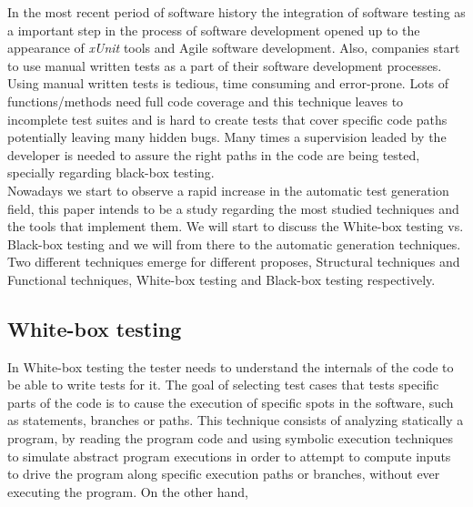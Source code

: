 \documentclass{llncs}
\newcommand{\xunit}{\textit{xUnit}}
\begin{document}
In the most recent period of software history the integration of software testing as a important step in the process of
software development opened up to the appearance of \xunit\cite{xunit} tools and Agile software development.
Also, companies start to use manual written tests as a part of their software development processes.\\
Using  manual written tests is tedious, time consuming and error-prone. Lots of functions/methods need full code coverage and this technique leaves
to incomplete test suites and is hard to create tests that cover specific code paths potentially leaving many hidden bugs. Many times a supervision leaded by the developer
is needed to assure the right paths in the code are being tested, specially regarding black-box testing.\\
\indent Nowadays we start to observe a rapid increase in the automatic test generation field, this paper intends to be a study regarding the most studied techniques
and the tools that implement them. We will start to discuss the White-box testing vs. Black-box testing and we will from there to the automatic generation techniques.\\

Two different techniques emerge for different proposes, Structural techniques and Functional techniques,
White-box testing and Black-box\cite{black} testing respectively.

\subsection{White-box testing}
In White-box testing the tester needs to understand the internals of the code to be able to write tests for it.
The goal of selecting test cases that tests specific parts of the code is to cause the execution of specific spots in the software, such as statements, branches or
paths. This technique consists of analyzing statically a program, by reading the program code and using symbolic execution techniques to simulate abstract program
executions in order to attempt to compute inputs to drive the program along specific execution paths or branches, without ever executing the program.
On the other hand,

\end{document}
